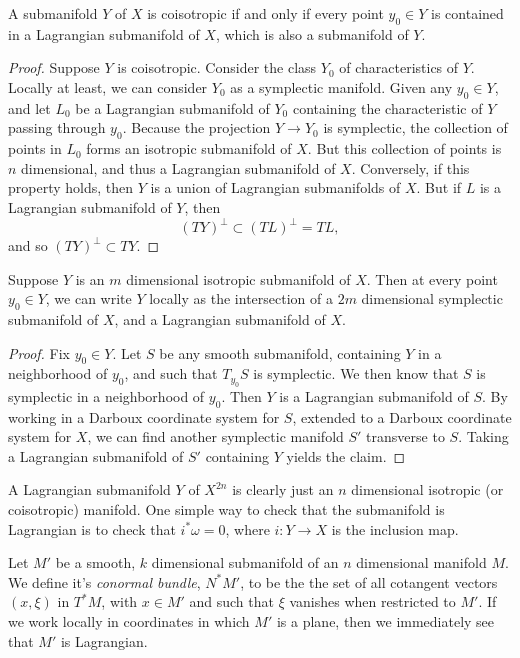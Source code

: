 \begin{theorem}
    A submanifold $Y$ of $X$ is coisotropic if and only if every point $y_0 \in Y$ is contained in a Lagrangian submanifold of $X$, which is also a submanifold of $Y$.
\end{theorem}
\begin{proof}
    Suppose $Y$ is coisotropic. Consider the class $Y_0$ of characteristics of $Y$. Locally at least, we can consider $Y_0$ as a symplectic manifold. Given any $y_0 \in Y$, and let $L_0$ be a Lagrangian submanifold of $Y_0$ containing the characteristic of $Y$ passing through $y_0$. Because the projection $Y \to Y_0$ is symplectic, the collection of points in $L_0$ forms an isotropic submanifold of $X$. But this collection of points is $n$ dimensional, and thus a Lagrangian submanifold of $X$. Conversely, if this property holds, then $Y$ is a union of Lagrangian submanifolds of $X$. But if $L$ is a Lagrangian submanifold of $Y$, then
    \[ (TY)^\perp \subset (TL)^\perp = TL, \]
    and so $(TY)^\perp \subset TY$.
\end{proof}

\begin{theorem}
    Suppose $Y$ is an $m$ dimensional isotropic submanifold of $X$. Then at every point $y_0 \in Y$, we can write $Y$ locally as the intersection of a $2m$ dimensional symplectic submanifold of $X$, and a Lagrangian submanifold of $X$.
\end{theorem}
\begin{proof}
    Fix $y_0 \in Y$. Let $S$ be any smooth submanifold, containing $Y$ in a neighborhood of $y_0$, and such that $T_{y_0} S$ is symplectic. We then know that $S$ is symplectic in a neighborhood of $y_0$. Then $Y$ is a Lagrangian submanifold of $S$. By working in a Darboux coordinate system for $S$, extended to a Darboux coordinate system for $X$, we can find another symplectic manifold $S'$ transverse to $S$. Taking a Lagrangian submanifold of $S'$ containing $Y$ yields the claim.
\end{proof}

A Lagrangian submanifold $Y$ of $X^{2n}$ is clearly just an $n$ dimensional isotropic (or coisotropic) manifold. One simple way to check that the submanifold is Lagrangian is to check that $i^* \omega = 0$, where $i: Y \to X$ is the inclusion map.

\begin{example}
    Let $M'$ be a smooth, $k$ dimensional submanifold of an $n$ dimensional manifold $M$. We define it's \emph{conormal bundle}, $N^* M'$, to be the the set of all cotangent vectors $(x,\xi)$ in $T^* M$, with $x \in M'$ and such that $\xi$ vanishes when restricted to $M'$. If we work locally in coordinates in which $M'$ is a plane, then we immediately see that $M'$ is Lagrangian.
\end{example}

